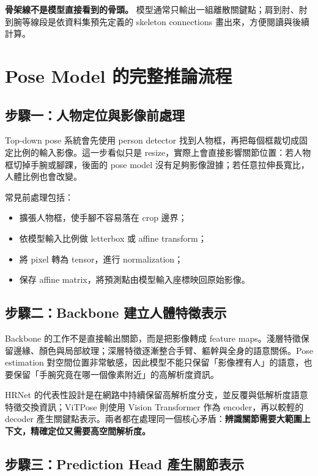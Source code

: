 \documentclass[11pt,a4paper,oneside]{report}
\begin{document}
\begin{plainBox}
\textbf{骨架線不是模型直接看到的骨頭。}\quad
模型通常只輸出一組離散關鍵點；肩到肘、肘到腕等線段是依資料集預先定義的 skeleton connections 畫出來，方便閱讀與後續計算。
\end{plainBox}

\section{Pose Model 的完整推論流程}

\subsection{步驟一：人物定位與影像前處理}

Top-down pose 系統會先使用 person detector 找到人物框，再把每個框裁切成固定比例的輸入影像。這一步看似只是 resize，實際上會直接影響關節位置：若人物框切掉手腕或腳踝，後面的 pose model 沒有足夠影像證據；若任意拉伸長寬比，人體比例也會改變。

常見前處理包括：
\begin{itemize}
  \item 擴張人物框，使手腳不容易落在 crop 邊界；
  \item 依模型輸入比例做 letterbox 或 affine transform；
  \item 將 pixel 轉為 tensor，進行 normalization；
  \item 保存 affine matrix，將預測點由模型輸入座標映回原始影像。
\end{itemize}

\subsection{步驟二：Backbone 建立人體特徵表示}

Backbone 的工作不是直接輸出關節，而是把影像轉成 feature maps。淺層特徵保留邊緣、顏色與局部紋理；深層特徵逐漸整合手臂、軀幹與全身的語意關係。Pose estimation 對空間位置非常敏感，因此模型不能只保留「影像裡有人」的語意，也要保留「手腕究竟在哪一個像素附近」的高解析度資訊。

HRNet 的代表性設計是在網路中持續保留高解析度分支，並反覆與低解析度語意特徵交換資訊；ViTPose 則使用 Vision Transformer 作為 encoder，再以較輕的 decoder 產生關鍵點表示。兩者都在處理同一個核心矛盾：\textbf{辨識關節需要大範圍上下文，精確定位又需要高空間解析度。}

\subsection{步驟三：Prediction Head 產生關節表示}
\end{document}

